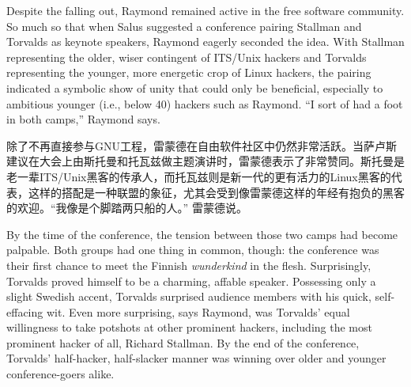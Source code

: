 \ifdefined\eng
Despite the falling out, Raymond remained active in the free software community. So much so that when Salus suggested a conference pairing Stallman and Torvalds as keynote speakers, Raymond eagerly seconded the idea. With Stallman representing the older, wiser contingent of ITS/Unix hackers and Torvalds representing the younger, more energetic crop of Linux hackers, the pairing indicated a symbolic show of unity that could only be beneficial, especially to ambitious younger (i.e., below 40) hackers such as Raymond. ``I sort of had a foot in both camps,'' Raymond says.
\fi

\ifdefined\chs
除了不再直接参与GNU工程，雷蒙德在自由软件社区中仍然非常活跃。当萨卢斯建议在大会上由斯托曼和托瓦兹做主题演讲时，雷蒙德表示了非常赞同。斯托曼是老一辈ITS/Unix黑客的传承人，而托瓦兹则是新一代的更有活力的Linux黑客的代表，这样的搭配是一种联盟的象征，尤其会受到像雷蒙德这样的年经有抱负的黑客的欢迎。``我像是个脚踏两只船的人。'' 雷蒙德说。
\fi

\ifdefined\eng
By the time of the conference, the tension between those two camps had become palpable. Both groups had one thing in common, though: the conference was their first chance to meet the Finnish \textit{wunderkind} in the flesh. Surprisingly, Torvalds proved himself to be a charming, affable speaker. Possessing only a slight Swedish accent, Torvalds surprised audience members with his quick, self-effacing wit. Even more surprising, says Raymond, was Torvalds' equal willingness to take potshots at other prominent hackers, including the most prominent hacker of all, Richard Stallman. By the end of the conference, Torvalds' half-hacker, half-slacker manner was winning over older and younger conference-goers alike.
\fi

